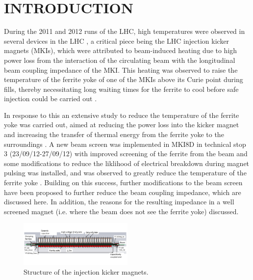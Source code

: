 \documentclass{JAC2003}
\begin{document}
% 

\section{INTRODUCTION}

During the 2011 and 2012 runs of the LHC, high temperatures were observed in several devices in the LHC  \cite{metral_cham2012}, a critical piece being the LHC injection kicker magnets (MKIs), which were attributed to beam-induced heating due to high power loss from the interaction of the circulating beam with the longitudinal beam coupling impedance of the MKI. This heating was observed to raise the temperature of the ferrite yoke of one of the MKIs above its Curie point during fills, thereby necessitating long waiting times for the ferrite to cool before safe injection could be carried out \cite{mki-heating}. 

In response to this an extensive study to reduce the temperature of the ferrite yoke was carried out, aimed at reducing the power loss into the kicker magnet and increasing the transfer of thermal energy from the ferrite yoke to the surroundings \cite{nik-HeatingTemp}. A new beam screen was implemented in MKI8D in technical stop 3 (23/09/12-27/09/12) with improved screening of the ferrite from the beam and some modifications to reduce the liklihood of electrical breakdown during magnet pulsing was installed, and was observed to greatly reduce the temperature of the ferrite yoke \cite{mki-heatingTemp}. Building on this success, further modifications to the beam screen have been proposed to further reduce the beam coupling impedance, which are discussed here. In addition, the reasons for the resulting impedance in a well screened magnet (i.e. where the beam does not see the ferrite yoke) discussed. 

\begin{figure}
\includegraphics[width=0.5\textwidth]{MKICrossSectionYZ.pdf}
\caption{Structure of the injection kicker magnets.}
\label{fig:mkiStruct}
\end{figure}
\end{document}
